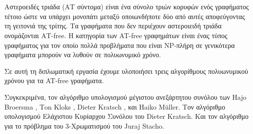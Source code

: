 \chapter*{\abstractname}
\addstarredchapter{\abstractname} %
\makecseabstract


\noindent Αστεροειδές τριάδα (ΑΤ σύντομα) είναι ένα σύνολο τριών κορυφών ενός γραφήματος τέτοιο ώστε να υπάρχει μονοπάτι μεταξύ οποιωνδήποτε δύο από αυτές αποφεύγοντας τη γειτονιά της τρίτης. Τα γραφήματα που δεν περιέχουν αστεροιειδή τριάδα ονομάζονται ΑT-free. Η κατηγορία των AT-free γραφημάτων είναι ένας τύπος γραφήματος για τον οποίο πολλά προβλήματα που είναι NP-πλήρη σε γενικότερα γραφήματα μπορούν να λυθούν σε πολυωνυμικό χρόνο.

Σε αυτή τη διπλωματική εργασία έχουμε υλοποιήσει τρεις αλγορίθμους πολυωνυμικού χρόνου για τα AT-free γραφήματα.

Συγκεκριμένα, τον αλγόριθμο υπολογισμού μέγιστου ανεξάρτητου συνόλου των Ηajo Βroersma , Τon Κloks , Dieter Kratsch , 
και Ηaiko Μüller\cite{at-free-independent-sets}. Τον αλγόριθμο υπολογισμού Ελάχιστου Κυρίαρχου Συνόλου του Dieter Kratsch\cite{at-free-domination}. 
Και τον αλγόριθμο για το πρόβλημα του 3-Χρωματισμού του Juraj Stacho\cite{at-free-3-colouring}. 
